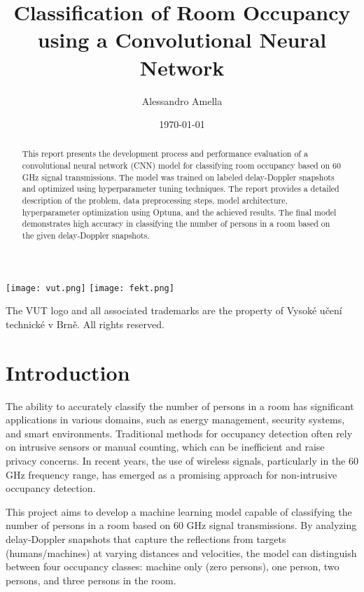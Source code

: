\documentclass{article}
\title{Classification of Room Occupancy using a Convolutional Neural Network}
\author{Alessandro Amella}
\date{\today}
\begin{document}
\maketitle

\begin{abstract}
    This report presents the development process and performance evaluation of a convolutional neural network (CNN) model for classifying room occupancy based on 60 GHz signal transmissions. The model was trained on labeled delay-Doppler snapshots and optimized using hyperparameter tuning techniques. The report provides a detailed description of the problem, data preprocessing steps, model architecture, hyperparameter optimization using Optuna, and the achieved results. The final model demonstrates high accuracy in classifying the number of persons in a room based on the given delay-Doppler snapshots.
\end{abstract}

\begin{center}
    \texttt{[image: vut.png]} %
    \hspace{1cm} %
    \texttt{[image: fekt.png]} %
\end{center}

\doclicenseThis%

\begin{center}
    \footnotesize{The VUT logo and all associated trademarks are the property of Vysoké učení technické v Brně. All rights reserved.}
\end{center}

\tableofcontents

\clearpage


\section{Introduction}
The ability to accurately classify the number of persons in a room has significant applications in various domains, such as energy management, security systems, and smart environments. Traditional methods for occupancy detection often rely on intrusive sensors or manual counting, which can be inefficient and raise privacy concerns. In recent years, the use of wireless signals, particularly in the 60 GHz frequency range, has emerged as a promising approach for non-intrusive occupancy detection.

This project aims to develop a machine learning model capable of classifying the number of persons in a room based on 60 GHz signal transmissions. By analyzing delay-Doppler snapshots that capture the reflections from targets (humans/machines) at varying distances and velocities, the model can distinguish between four occupancy classes: machine only (zero persons), one person, two persons, and three persons in the room.
\end{document}
